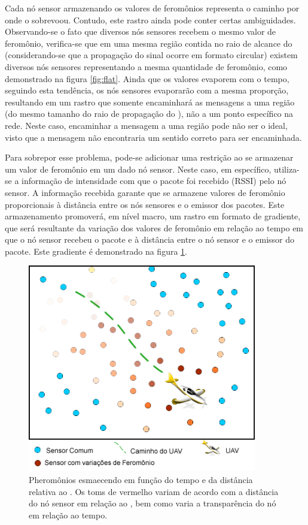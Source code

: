 Cada nó sensor armazenando os valores de feromônios representa o caminho por onde o \vant sobrevoou. Contudo, este rastro ainda pode conter certas ambiguidades. Observando-se o fato que diversos nós sensores recebem o mesmo valor de feromônio, verifica-se que em uma mesma região contida no raio de alcance do \vant (considerando-se que a propagação do sinal ocorre em formato circular) existem diversos nós sensores representando a mesma quantidade de feromônio, como demonstrado na figura \ref{fig:flat}. Ainda que os valores evaporem com o tempo, seguindo esta tendência, os nós sensores evaporarão com a mesma proporção, resultando em um rastro que somente encaminhará as mensagens a uma região (do mesmo tamanho do raio de propagação do \vant), não a um ponto específico na rede. Neste caso, encaminhar a mensagem a uma região pode não ser o ideal, visto que a mensagem não encontraria um sentido correto para ser encaminhada.



Para sobrepor esse problema, pode-se adicionar uma restrição ao se armazenar um valor de feromônio em um dado nó sensor. Neste caso, em específico, utiliza-se a informação de intensidade com que o pacote foi recebido (RSSI) pelo nó sensor. A informação recebida garante que se armazene valores de feromônio proporcionais à distância entre os nós sensores e o emissor dos pacotes. Este armazenamento promoverá, em nível macro, um rastro em formato de gradiente, que será resultante da variação dos valores de feromônio em relação ao tempo em que o nó sensor recebeu o pacote e à distância entre o nó sensor e o \vant emissor do pacote. Este gradiente é demonstrado na figura \ref{fig:gradient}.

 \begin{figure}[h!]
 \centering
 \includegraphics[width=10cm]{pictures/gradient.png}
 \caption{Pheromônios esmaecendo em função do tempo e da distância relativa ao \vant. Os toms de vermelho variam de acordo com a distância do nó sensor em relação ao \vant, bem como varia a transparência do nó em relação ao tempo.}
  \label{fig:gradient}
 \end{figure}


